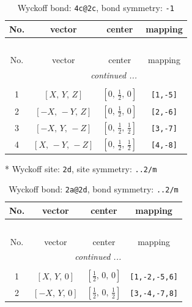 \documentclass[fleqn,8pt]{jsarticle}
\begin{document}
\begin{longtable}{cccc}
\caption{Wyckoff bond: {\tt 4c@2c}, bond symmetry: {\tt -1}}
 \\
 \hline \hline
No. & vector & center & mapping \\ \hline \endfirsthead

\multicolumn{3}{l}{\tablename\ \thetable{}} \\
 \hline \hline
No. & vector & center & mapping \\ \hline \endhead

 \hline \hline
\multicolumn{3}{r}{\footnotesize\it continued ...} \\ \endfoot

 \hline \hline
\multicolumn{3}{r}{} \\ \endlastfoot

1 & $\left[ X,\, Y,\, Z \right]$ & $\left[ 0,\, \frac{1}{2},\, 0 \right]$ & {\tt [1,-5]} \\ \hline
2 & $\left[ - X,\, - Y,\, Z \right]$ & $\left[ 0,\, \frac{1}{2},\, 0 \right]$ & {\tt [2,-6]} \\ \hline
3 & $\left[ - X,\, Y,\, - Z \right]$ & $\left[ 0,\, \frac{1}{2},\, \frac{1}{2} \right]$ & {\tt [3,-7]} \\ \hline
4 & $\left[ X,\, - Y,\, - Z \right]$ & $\left[ 0,\, \frac{1}{2},\, \frac{1}{2} \right]$ & {\tt [4,-8]} \\
\end{longtable}
* Wyckoff site: {\tt 2d}, site symmetry: {\tt ..2/m}
\renewcommand{\arraystretch}{1.2}
\begin{longtable}{cccc}
\caption{Wyckoff bond: {\tt 2a@2d}, bond symmetry: {\tt ..2/m}}
 \\
 \hline \hline
No. & vector & center & mapping \\ \hline \endfirsthead

\multicolumn{3}{l}{\tablename\ \thetable{}} \\
 \hline \hline
No. & vector & center & mapping \\ \hline \endhead

 \hline \hline
\multicolumn{3}{r}{\footnotesize\it continued ...} \\ \endfoot

 \hline \hline
\multicolumn{3}{r}{} \\ \endlastfoot

1 & $\left[ X,\, Y,\, 0 \right]$ & $\left[ \frac{1}{2},\, 0,\, 0 \right]$ & {\tt [1,-2,-5,6]} \\ \hline
2 & $\left[ - X,\, Y,\, 0 \right]$ & $\left[ \frac{1}{2},\, 0,\, \frac{1}{2} \right]$ & {\tt [3,-4,-7,8]} \\
\end{longtable}
\end{document}
